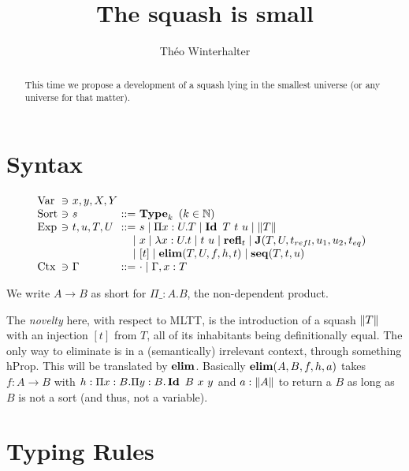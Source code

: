 \documentclass[a4paper,english]{lipics-utf8x}
\title{The squash is small}
\author[1]{Théo Winterhalter}
\begin{document}
  \maketitle

  \begin{abstract}
    This time we propose a development of a squash lying in the smallest
    universe (or any universe for that matter).
  \end{abstract}

  \section{Syntax}

  \[
    \begin{array}{l@{~}l@{~}l@{~}r@{~}l@{\quad}l}
      \Var  & \ni & x,y,X,Y \\
      \Sort & \ni & s             & ::= & \Type_k \mbox{ }
                                                (k \in \mathbb{N}) \\
      \Exp  & \ni & t,u,T,U & ::= & s \mid \Pi x:U.T \mid
                                    \Id T\ t\ u \mid \squash{T} \\
                         &&& \mid & x \mid \lambda x:U.t \mid t~u
                               \mid \refl_t \mid
                               \J (T,U,t_{refl},u_1,u_2,t_{eq}) \\
                         &&& \mid & [t] \mid \elim(T,U,f,h,t)
                             \mid \seq(T,t,u) \\
      \Ctx  & \ni & \Gamma  & ::= & \cdot \mid \Gamma, x:T \\
    \end{array}
  \]

  \noindent %
  We write $A \to B$ as short for $\Pi \_:A.B$, the non-dependent product.

  The \emph{novelty} here, with respect to MLTT, is the introduction of a squash
  $\|T\|$ with an injection $[t]$ from $T$, all of its inhabitants being
  definitionally equal. The only way to eliminate is in a (semantically)
  irrelevant context, \ie through something hProp.
  This will be translated by $\operatorname{\mathbf{elim}}$.
  Basically $\operatorname{\mathbf{elim}}(A,B,f,h,a)$ takes $f : A \to B$ with
  $h : \Pi x:B. \Pi y:B. \Id B\ x\ y$ and $a : \|A\|$ to return a $B$
  as long as $B$ is not a sort (and thus, not a variable).

  \section{Typing Rules}
\end{document}
